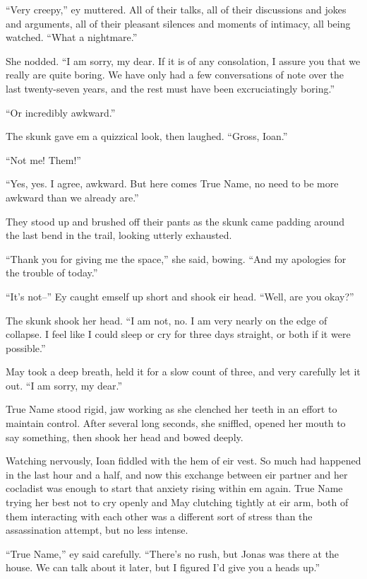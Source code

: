 ``Very creepy,'' ey muttered. All of their talks, all of their discussions and jokes and arguments, all of their pleasant silences and moments of intimacy, all being watched. ``What a nightmare.''

She nodded. ``I am sorry, my dear. If it is of any consolation, I assure you that we really are quite boring. We have only had a few conversations of note over the last twenty-seven years, and the rest must have been excruciatingly boring.''

``Or incredibly awkward.''

The skunk gave em a quizzical look, then laughed. ``Gross, Ioan.''

``Not me! Them!''

``Yes, yes. I agree, awkward. But here comes True Name, no need to be more awkward than we already are.''

They stood up and brushed off their pants as the skunk came padding around the last bend in the trail, looking utterly exhausted.

``Thank you for giving me the space,'' she said, bowing. ``And my apologies for the trouble of today.''

``It's not--'' Ey caught emself up short and shook eir head. ``Well, are you okay?''

The skunk shook her head. ``I am not, no. I am very nearly on the edge of collapse. I feel like I could sleep or cry for three days straight, or both if it were possible.''

May took a deep breath, held it for a slow count of three, and very carefully let it out. ``I am sorry, my dear.''

True Name stood rigid, jaw working as she clenched her teeth in an effort to maintain control. After several long seconds, she sniffled, opened her mouth to say something, then shook her head and bowed deeply.

Watching nervously, Ioan fiddled with the hem of eir vest. So much had happened in the last hour and a half, and now this exchange between eir partner and her cocladist was enough to start that anxiety rising within em again. True Name trying her best not to cry openly and May clutching tightly at eir arm, both of them interacting with each other was a different sort of stress than the assassination attempt, but no less intense.

``True Name,'' ey said carefully. ``There's no rush, but Jonas was there at the house. We can talk about it later, but I figured I'd give you a heads up.''


